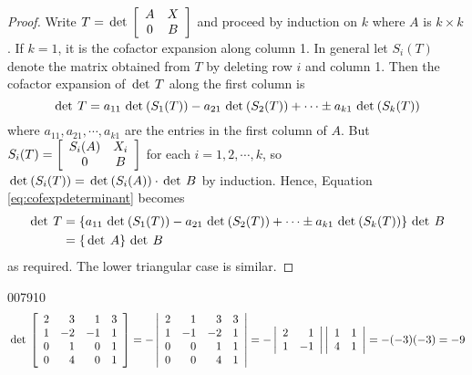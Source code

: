 \begin{proof}
Write $ T = \thinspace\operatorname{det\medspace} \left[ \begin{array}{cc}
A & X \\
0 & B 
\end{array}\right]$
 and proceed by induction on $k$ where $A$ is $k \times k$. If $k = 1$, it is the cofactor expansion along column 1. In general let $S_i(T)$ denote the matrix obtained from $T$ by deleting row $i$ and column 1. Then the cofactor expansion of $\thinspace\operatorname{det \medspace} T$ along the first column is
\begin{equation}\label{eq:cofexpdeterminant}
\thinspace\operatorname{det \medspace} T = a_{11}\thinspace\operatorname{det\medspace}(S_1(T))-a_{21}\thinspace\operatorname{det\medspace}(S_2(T)) + \cdots \pm a_{k1}\thinspace\operatorname{det\medspace}(S_k(T))
\end{equation}
where $a_{11}, a_{21}, \cdots, a_{k1}$  are the entries in the first column of $A$. But $S_i(T) = \left[ \begin{array}{cc}
S_i(A) & X_i \\
0 & B 
\end{array} \right]$ 
 for each $i = 1, 2, \cdots, k$, so $\thinspace\operatorname{det\medspace}(S_i(T)) = \thinspace\operatorname{det\medspace}(S_i(A)) \cdot \thinspace\operatorname{det \medspace} B$ by induction. Hence, Equation \ref{eq:cofexpdeterminant} becomes
\begin{align*}
\thinspace\operatorname{det \medspace} T &= \left\{ a_{11}\thinspace\operatorname{det\medspace}(S_1(T))-a_{21}\thinspace\operatorname{det\medspace}(S_2(T)) + \cdots \pm a_{k1}\thinspace\operatorname{det\medspace}(S_k(T))\right\} \thinspace\operatorname{det \medspace} B \\
&= \left\{ \thinspace\operatorname{det \medspace} A \right\} \thinspace\operatorname{det \medspace} B
\end{align*}
as required. The lower triangular case is similar.
\end{proof}

\begin{example}{}{007910}
\begin{equation*}
\thinspace\operatorname{det\medspace} \left[ \begin{array}{rrrr}
2 & 3 & 1 & 3 \\
1 & -2 & -1 & 1 \\
0 & 1 & 0 & 1 \\
0 & 4 & 0 & 1
\end{array} \right]
= 
- \left| \begin{array}{rrrr}
2 & 1 & 3 & 3 \\
1 & -1 & -2 & 1 \\
0 & 0 & 1 & 1 \\
0 & 0 & 4 & 1
\end{array} \right|
=
-\left| \begin{array}{rr}
2 & 1 \\
1 & -1 
\end{array} \right|
\left| \begin{array}{rr}
1 & 1 \\
4 & 1 
\end{array} \right|
= - (-3)(-3) = -9
\end{equation*}
\end{example}

